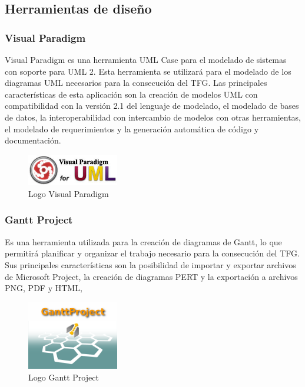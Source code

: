 	\subsection{Herramientas de diseño}
		\subsubsection{Visual Paradigm}
		Visual Paradigm es una herramienta \ac{UML} \ac{Case} para el modelado de sistemas con soporte para \ac{UML} 2.
		Esta herramienta se utilizará para el modelado de los diagramas \ac{UML} necesarios para la consecución del \ac{TFG}.
		Las principales características de esta aplicación son la creación de modelos \ac{UML} con compatibilidad con la versión 2.1 del lenguaje de modelado, el modelado de bases de datos, la interoperabilidad con intercambio de modelos con otras herramientas, el modelado de requerimientos y la generación automática de código y documentación.
		
		\begin{figure}[H]
		\centering
		\includegraphics[width=40mm, fbox={\fboxrule} 4mm]{images/04-metodo/14-visual_paradigm_logo.jpg}
		\caption{Logo Visual Paradigm}
		\label{fig:visual-paradigm-logo}
		\end{figure}
		
		\subsubsection{Gantt Project}
		Es una herramienta utilizada para la creación de diagramas de Gantt, lo que permitirá planificar y organizar el trabajo necesario para la consecución del \ac{TFG}.
		Sus principales características son la posibilidad de importar y exportar archivos de Microsoft Project, la creación de diagramas PERT y la exportación a archivos \ac{PNG}, \ac{PDF} y \ac{HTML},
		
		\begin{figure}[H]
		\centering
		\includegraphics[width=40mm, fbox={\fboxrule} 4mm]{images/04-metodo/15-gantt_project_logo.png}
		\caption{Logo Gantt Project}
		\label{fig:gantt-project-logo}
		\end{figure}
		
